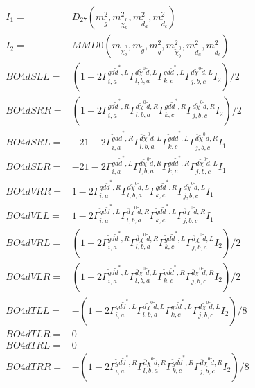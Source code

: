 \documentclass[A4,landscape]{article}
\begin{document}
\begin{align} 
I_1 = & D_{27}(m^2_{\tilde{g}}, m^2_{\tilde{\chi}^0_{{b}}}, m^2_{\tilde{d}_{{a}}}, m^2_{\tilde{d}_{{c}}}) \\ 
I_2 = & MMD0(m_{\tilde{\chi}^0_{{b}}}, m_{\tilde{g}}, m^2_{\tilde{g}}, m^2_{\tilde{\chi}^0_{{b}}}, m^2_{\tilde{d}_{{a}}}, m^2_{\tilde{d}_{{c}}}) \\ 
  BO4dSLL= & (1
-
2 \Gamma^{\tilde{g} d \tilde{d}^*,L}_{i, a} \Gamma^{\bar{d}\tilde{\chi}^0 \tilde{d} ,L}_{l, b, a} \Gamma^{\tilde{g} d \tilde{d}^*,L}_{k, c} \Gamma^{\bar{d}\tilde{\chi}^0 \tilde{d} ,L}_{j, b, c} I_2)/2 \\ 
  BO4dSRR= & (1
-
2 \Gamma^{\tilde{g} d \tilde{d}^*,R}_{i, a} \Gamma^{\bar{d}\tilde{\chi}^0 \tilde{d} ,R}_{l, b, a} \Gamma^{\tilde{g} d \tilde{d}^*,R}_{k, c} \Gamma^{\bar{d}\tilde{\chi}^0 \tilde{d} ,R}_{j, b, c} I_2)/2 \\ 
  BO4dSRL= & -2 1
-
2 \Gamma^{\tilde{g} d \tilde{d}^*,R}_{i, a} \Gamma^{\bar{d}\tilde{\chi}^0 \tilde{d} ,L}_{l, b, a} \Gamma^{\tilde{g} d \tilde{d}^*,L}_{k, c} \Gamma^{\bar{d}\tilde{\chi}^0 \tilde{d} ,R}_{j, b, c} I_1 \\ 
  BO4dSLR= & -2 1
-
2 \Gamma^{\tilde{g} d \tilde{d}^*,L}_{i, a} \Gamma^{\bar{d}\tilde{\chi}^0 \tilde{d} ,R}_{l, b, a} \Gamma^{\tilde{g} d \tilde{d}^*,R}_{k, c} \Gamma^{\bar{d}\tilde{\chi}^0 \tilde{d} ,L}_{j, b, c} I_1 \\ 
  BO4dVRR= & 1
-
2 \Gamma^{\tilde{g} d \tilde{d}^*,R}_{i, a} \Gamma^{\bar{d}\tilde{\chi}^0 \tilde{d} ,L}_{l, b, a} \Gamma^{\tilde{g} d \tilde{d}^*,R}_{k, c} \Gamma^{\bar{d}\tilde{\chi}^0 \tilde{d} ,L}_{j, b, c} I_1 \\ 
  BO4dVLL= & 1
-
2 \Gamma^{\tilde{g} d \tilde{d}^*,L}_{i, a} \Gamma^{\bar{d}\tilde{\chi}^0 \tilde{d} ,R}_{l, b, a} \Gamma^{\tilde{g} d \tilde{d}^*,L}_{k, c} \Gamma^{\bar{d}\tilde{\chi}^0 \tilde{d} ,R}_{j, b, c} I_1 \\ 
  BO4dVRL= & (1
-
2 \Gamma^{\tilde{g} d \tilde{d}^*,R}_{i, a} \Gamma^{\bar{d}\tilde{\chi}^0 \tilde{d} ,R}_{l, b, a} \Gamma^{\tilde{g} d \tilde{d}^*,L}_{k, c} \Gamma^{\bar{d}\tilde{\chi}^0 \tilde{d} ,L}_{j, b, c} I_2)/2 \\ 
  BO4dVLR= & (1
-
2 \Gamma^{\tilde{g} d \tilde{d}^*,L}_{i, a} \Gamma^{\bar{d}\tilde{\chi}^0 \tilde{d} ,L}_{l, b, a} \Gamma^{\tilde{g} d \tilde{d}^*,R}_{k, c} \Gamma^{\bar{d}\tilde{\chi}^0 \tilde{d} ,R}_{j, b, c} I_2)/2 \\ 
  BO4dTLL= & -(1
-
2 \Gamma^{\tilde{g} d \tilde{d}^*,L}_{i, a} \Gamma^{\bar{d}\tilde{\chi}^0 \tilde{d} ,L}_{l, b, a} \Gamma^{\tilde{g} d \tilde{d}^*,L}_{k, c} \Gamma^{\bar{d}\tilde{\chi}^0 \tilde{d} ,L}_{j, b, c} I_2)/8 \\ 
  BO4dTLR= & 0 \\ 
  BO4dTRL= & 0 \\ 
  BO4dTRR= & -(1
-
2 \Gamma^{\tilde{g} d \tilde{d}^*,R}_{i, a} \Gamma^{\bar{d}\tilde{\chi}^0 \tilde{d} ,R}_{l, b, a} \Gamma^{\tilde{g} d \tilde{d}^*,R}_{k, c} \Gamma^{\bar{d}\tilde{\chi}^0 \tilde{d} ,R}_{j, b, c} I_2)/8 \\ 
\end{align} 
\end{document}
